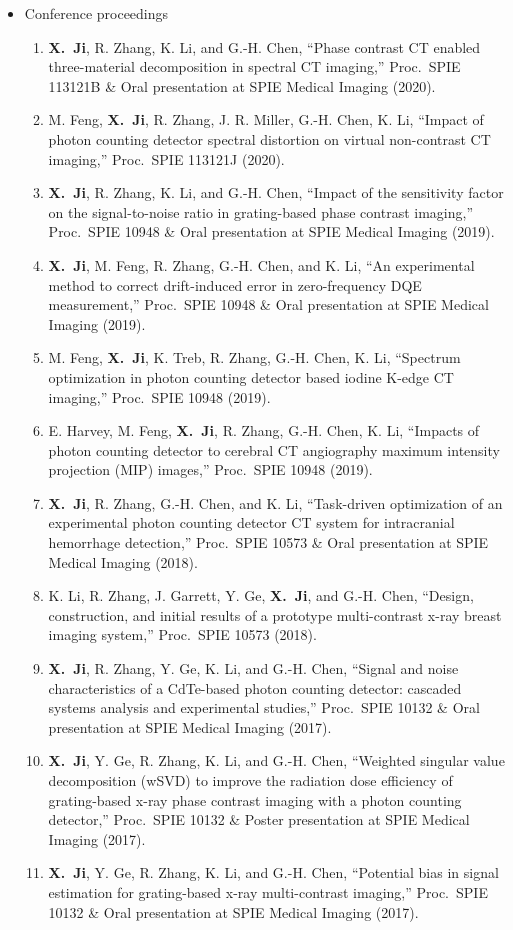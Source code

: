\documentclass[letterpaper,11pt]{article}
\newcommand{\xji}{\textbf{X.~Ji}}
\begin{document}
\begin{itemize}
\item Conference proceedings
\begin{enumerate}\justifying
\item \xji, R. Zhang, K. Li, and G.-H. Chen, ``Phase contrast CT enabled three-material decomposition in spectral CT imaging,'' Proc.~SPIE 113121B \& Oral presentation at SPIE Medical Imaging (2020).
\item M. Feng, \xji, R. Zhang, J. R. Miller, G.-H. Chen, K. Li, ``Impact of photon counting detector spectral distortion on virtual non-contrast CT imaging,'' Proc.~SPIE 113121J (2020).
\item \xji, R. Zhang, K. Li, and G.-H. Chen, ``Impact of the sensitivity factor on the signal-to-noise ratio in grating-based phase contrast imaging,'' Proc.~SPIE 10948 \& Oral presentation at SPIE Medical Imaging (2019).
\item \xji, M. Feng, R. Zhang, G.-H. Chen, and K. Li, ``An experimental method to correct drift-induced error in zero-frequency DQE measurement,'' Proc.~SPIE 10948 \& Oral presentation at SPIE Medical Imaging (2019).
\item M. Feng, \xji, K. Treb, R. Zhang, G.-H. Chen, K. Li, ``Spectrum optimization in photon counting detector based iodine K-edge CT imaging,'' Proc.~SPIE 10948 (2019).
\item E. Harvey, M. Feng, \xji, R. Zhang, G.-H. Chen, K. Li, ``Impacts of photon counting detector to cerebral CT angiography maximum intensity projection (MIP) images,'' Proc.~SPIE 10948 (2019).
\item \xji, R. Zhang, G.-H. Chen, and K. Li, ``Task-driven optimization of an experimental photon counting detector CT system for intracranial hemorrhage detection,'' Proc.~SPIE 10573 \& Oral presentation at SPIE Medical Imaging (2018).
\item K. Li, R. Zhang, J. Garrett, Y. Ge, \xji, and G.-H. Chen, ``Design, construction, and initial results of a prototype multi-contrast x-ray breast imaging system,'' Proc.~SPIE 10573 (2018).
\item \xji, R. Zhang, Y. Ge, K. Li, and G.-H. Chen, ``Signal and noise characteristics of a CdTe-based photon counting detector: cascaded systems analysis and experimental studies,'' Proc.~SPIE 10132 \& Oral presentation at SPIE Medical Imaging (2017).
\item \xji, Y. Ge, R. Zhang, K. Li, and G.-H. Chen, ``Weighted singular value decomposition (wSVD) to improve the radiation dose efficiency of grating-based x-ray phase contrast imaging with a photon counting detector,'' Proc.~SPIE 10132 \& Poster presentation at SPIE Medical Imaging (2017).
\item \xji, Y. Ge, R. Zhang, K. Li, and G.-H. Chen, ``Potential bias in signal estimation for grating-based x-ray multi-contrast imaging,'' Proc.~SPIE 10132 \& Oral presentation at SPIE Medical Imaging (2017).
\end{enumerate}
 

\end{itemize}
\end{document}
